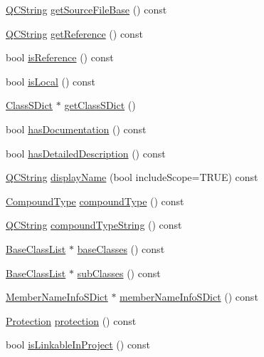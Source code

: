 \begin{DoxyCompactItemize}
\item 
\hyperlink{class_q_c_string}{Q\-C\-String} \hyperlink{class_class_def_a0b24a407e5cd41328e5c64aac0884b6f}{get\-Source\-File\-Base} () const 
\item 
\hyperlink{class_q_c_string}{Q\-C\-String} \hyperlink{class_class_def_a87b81ea7f17740033bf8fb12f796c494}{get\-Reference} () const 
\item 
bool \hyperlink{class_class_def_ab7dc8cc872f3cec2e07dace4293989aa}{is\-Reference} () const 
\item 
bool \hyperlink{class_class_def_a69fb7e260ed2bc6fa82bfe12c2aeec5a}{is\-Local} () const 
\item 
\hyperlink{class_class_s_dict}{Class\-S\-Dict} $\ast$ \hyperlink{class_class_def_a14c0b45a5896c00649594a0951ae30f7}{get\-Class\-S\-Dict} ()
\item 
bool \hyperlink{class_class_def_a585dcd381ab70014568db8ad457fc8b1}{has\-Documentation} () const 
\item 
bool \hyperlink{class_class_def_ab1e57fff5fd6e501a15f6e992a783995}{has\-Detailed\-Description} () const 
\item 
\hyperlink{class_q_c_string}{Q\-C\-String} \hyperlink{class_class_def_abfd9c72c9c6a40b1689b0671eebc044c}{display\-Name} (bool include\-Scope=T\-R\-U\-E) const 
\item 
\hyperlink{class_class_def_a768a6f0a6fd7e9087ff7971abbcc3f36}{Compound\-Type} \hyperlink{class_class_def_ae5dffc6bd9342e513fc2b9902a150abe}{compound\-Type} () const 
\item 
\hyperlink{class_q_c_string}{Q\-C\-String} \hyperlink{class_class_def_a259ebc501d584761467e254f635fd766}{compound\-Type\-String} () const 
\item 
\hyperlink{class_base_class_list}{Base\-Class\-List} $\ast$ \hyperlink{class_class_def_af817cb1006279d14dca4b6b6ba3db901}{base\-Classes} () const 
\item 
\hyperlink{class_base_class_list}{Base\-Class\-List} $\ast$ \hyperlink{class_class_def_a33f96bac2c9a43e8f6faaeca118d2c73}{sub\-Classes} () const 
\item 
\hyperlink{class_member_name_info_s_dict}{Member\-Name\-Info\-S\-Dict} $\ast$ \hyperlink{class_class_def_abbca3615e0d59730e500151d54561416}{member\-Name\-Info\-S\-Dict} () const 
\item 
\hyperlink{types_8h_a90e352184df58cd09455fe9996cd4ded}{Protection} \hyperlink{class_class_def_a149b66b75ad6cd6c17457a689e68cd9e}{protection} () const 
\item 
bool \hyperlink{class_class_def_a7ff00a84da6e47f3c64c6bf9f6316385}{is\-Linkable\-In\-Project} () const 

\end{DoxyCompactItemize}
